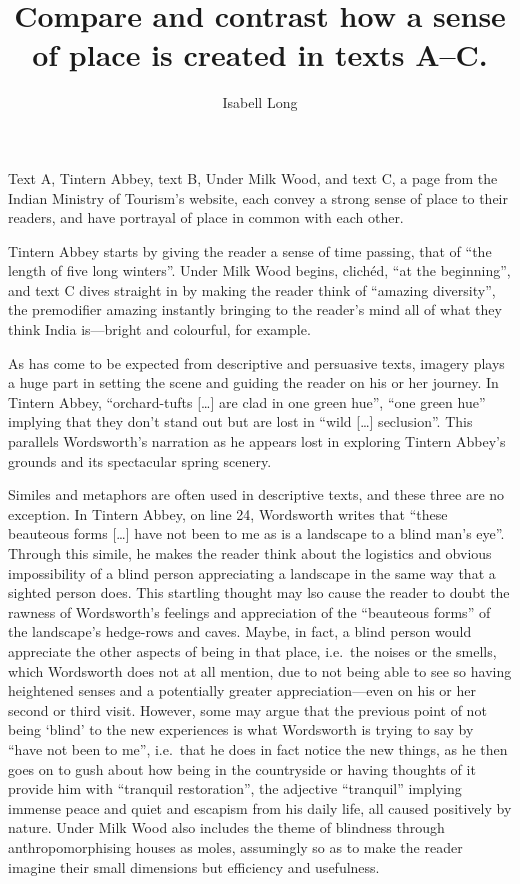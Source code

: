 \documentclass[11pt,a4paper]{article}
\begin{document}
\title{Compare and contrast how a sense of place is created in texts A--C.}
\author{Isabell Long}
\maketitle

Text A, Tintern Abbey, text B, Under Milk Wood, and text C, a page from the Indian Ministry of Tourism's website, each convey a strong sense of place to their readers, and have portrayal of place in common with each other.

Tintern Abbey starts by giving the reader a sense of time passing, that of ``the length of five long winters''. Under Milk Wood begins, clich\'{e}d, ``at the beginning'', and text C dives straight in by making the reader think of ``amazing diversity'', the premodifier amazing instantly bringing to the reader's mind all of what they think India is---bright and colourful, for example.

As has come to be expected from descriptive and persuasive texts, imagery plays a huge part in setting the scene and guiding the reader on his or her journey. In Tintern Abbey, ``orchard-tufts [\ldots] are clad in one green hue'', ``one green hue'' implying that they don't stand out but are lost in ``wild [\ldots] seclusion''. This parallels Wordsworth's narration as he appears lost in exploring Tintern Abbey's grounds and its spectacular spring scenery.

Similes and metaphors are often used in descriptive texts, and these three are no exception. In Tintern Abbey, on line 24, Wordsworth writes that ``these beauteous forms [\ldots] have not been to me as is a landscape to a blind man's eye''. Through this simile, he makes the reader think about the logistics and obvious impossibility of a blind person appreciating a landscape in the same way that a sighted person does. This startling thought may lso cause the reader to doubt the rawness of Wordsworth's feelings and appreciation of the ``beauteous forms'' of the landscape's hedge-rows and caves. Maybe, in fact, a blind person would appreciate the other aspects of being in that place, i.e.\ the noises or the smells, which Wordsworth does not at all mention, due to not being able to see so having heightened senses and a potentially greater appreciation---even on his or her second or third visit. However, some may argue that the previous point of not being `blind' to the new experiences is what Wordsworth is trying to say by ``have not been to me'', i.e.\ that he does in fact notice the new things, as he then goes on to gush about how being in the countryside or having thoughts of it provide him with ``tranquil restoration'', the adjective ``tranquil'' implying immense peace and quiet and escapism from his daily life, all caused positively by nature. Under Milk Wood also includes the theme of blindness through anthropomorphising houses as moles, assumingly so as to make the reader imagine their small dimensions but efficiency and usefulness.
\end{document}
